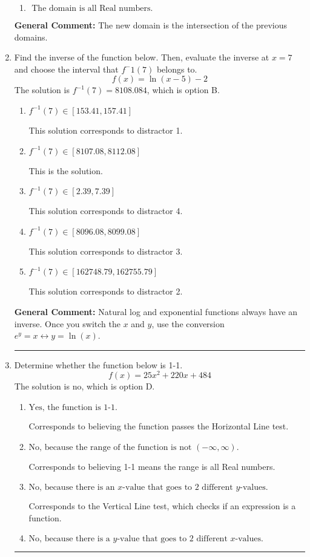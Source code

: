 \documentclass{extbook}[14pt]
\newcommand{\litem}[1]{\item #1

\rule{\textwidth}{0.4pt}}
\begin{document}
\begin{enumerate}
{\begin{enumerate}[label=\Alph*.]
\item \( \text{ The domain is all Real numbers. } \)


\end{enumerate}

\textbf{General Comment:} The new domain is the intersection of the previous domains.
}
\litem{
Find the inverse of the function below. Then, evaluate the inverse at $x = 7$ and choose the interval that $f^-1(7)$ belongs to.
\[ f(x) = \ln{(x-5)}-2 \]The solution is \( f^{-1}(7) = 8108.084 \), which is option B.\begin{enumerate}[label=\Alph*.]
\item \( f^{-1}(7) \in [153.41, 157.41] \)

 This solution corresponds to distractor 1.
\item \( f^{-1}(7) \in [8107.08, 8112.08] \)

 This is the solution.
\item \( f^{-1}(7) \in [2.39, 7.39] \)

 This solution corresponds to distractor 4.
\item \( f^{-1}(7) \in [8096.08, 8099.08] \)

 This solution corresponds to distractor 3.
\item \( f^{-1}(7) \in [162748.79, 162755.79] \)

 This solution corresponds to distractor 2.
\end{enumerate}

\textbf{General Comment:} Natural log and exponential functions always have an inverse. Once you switch the $x$ and $y$, use the conversion $ e^y = x \leftrightarrow y=\ln(x)$.
}
\litem{
Determine whether the function below is 1-1.
\[ f(x) = 25 x^2 + 220 x + 484 \]The solution is \( \text{no} \), which is option D.\begin{enumerate}[label=\Alph*.]
\item \( \text{Yes, the function is 1-1.} \)

Corresponds to believing the function passes the Horizontal Line test.
\item \( \text{No, because the range of the function is not $(-\infty, \infty)$.} \)

Corresponds to believing 1-1 means the range is all Real numbers.
\item \( \text{No, because there is an $x$-value that goes to 2 different $y$-values.} \)

Corresponds to the Vertical Line test, which checks if an expression is a function.
\item \( \text{No, because there is a $y$-value that goes to 2 different $x$-values.} \)


\end{enumerate}}
\end{enumerate}
\end{document}
